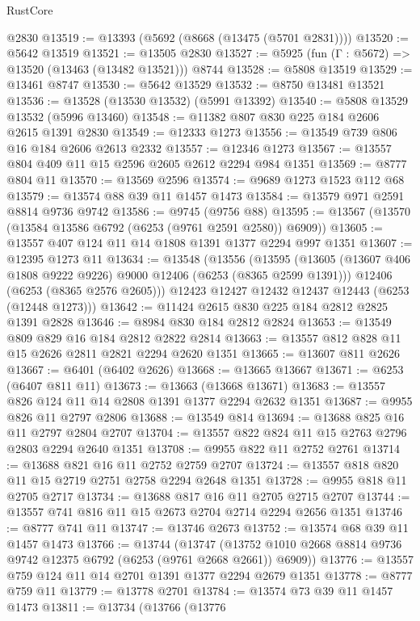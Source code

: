 \begin{lexlean}{RustCore}
\begin{coremodule}
    @2830
@13519 := @13393 (@5692 (@8668 (@13475 (@5701 @2831))))
@13520 := @5642 @13519
@13521 := @13505 @2830
@13527 := @5925 (fun (Γ : @5672) => @13520 (@13463 (@13482 @13521))) @8744
@13528 := @5808 @13519
@13529 := @13461 @8747
@13530 := @5642 @13529
@13532 := @8750 @13481 @13521
@13536 := @13528 (@13530 @13532) (@5991 @13392)
@13540 := @5808 @13529 @13532 (@5996 @13460)
@13548 := @11382 @807 @830 @225 @184 @2606 @2615 @1391 @2830
@13549 := @12333 @1273
@13556 := @13549 @739 @806 @16 @184 @2606 @2613 @2332
@13557 := @12346 @1273
@13567 := @13557 @804 @409 @11 @15 @2596 @2605 @2612 @2294 @984 @1351
@13569 := @8777 @804 @11
@13570 := @13569 @2596
@13574 := @9689 @1273 @1523 @112 @68
@13579 := @13574 @88 @39 @11 @1457 @1473
@13584 := @13579 @971 @2591 @8814 @9736 @9742
@13586 := @9745 (@9756 @88)
@13595 := @13567 (@13570 (@13584 @13586 @6792 (@6253 (@9761 @2591 @2580)) @6909))
@13605 := @13557 @407 @124 @11 @14 @1808 @1391 @1377 @2294 @997 @1351
@13607 := @12395 @1273 @11
@13634 := @13548
    (@13556
      (@13595
        (@13605 (@13607 @406 @1808 @9222 @9226) @9000 @12406 (@6253 (@8365 @2599 @1391)))
        @12406
        (@6253 (@8365 @2576 @2605)))
      @12423
      @12427
      @12432
      @12437
      @12443
      (@6253 (@12448 @1273)))
@13642 := @11424 @2615 @830 @225 @184 @2812 @2825 @1391 @2828
@13646 := @8984 @830 @184 @2812 @2824
@13653 := @13549 @809 @829 @16 @184 @2812 @2822 @2814
@13663 := @13557 @812 @828 @11 @15 @2626 @2811 @2821 @2294 @2620 @1351
@13665 := @13607 @811 @2626
@13667 := @6401 (@6402 @2626)
@13668 := @13665 @13667
@13671 := @6253 (@6407 @811 @11)
@13673 := @13663 (@13668 @13671)
@13683 := @13557 @826 @124 @11 @14 @2808 @1391 @1377 @2294 @2632 @1351
@13687 := @9955 @826 @11 @2797 @2806
@13688 := @13549 @814
@13694 := @13688 @825 @16 @11 @2797 @2804 @2707
@13704 := @13557 @822 @824 @11 @15 @2763 @2796 @2803 @2294 @2640 @1351
@13708 := @9955 @822 @11 @2752 @2761
@13714 := @13688 @821 @16 @11 @2752 @2759 @2707
@13724 := @13557 @818 @820 @11 @15 @2719 @2751 @2758 @2294 @2648 @1351
@13728 := @9955 @818 @11 @2705 @2717
@13734 := @13688 @817 @16 @11 @2705 @2715 @2707
@13744 := @13557 @741 @816 @11 @15 @2673 @2704 @2714 @2294 @2656 @1351
@13746 := @8777 @741 @11
@13747 := @13746 @2673
@13752 := @13574 @68 @39 @11 @1457 @1473
@13766 := @13744
    (@13747 (@13752 @1010 @2668 @8814 @9736 @9742 @12375 @6792 (@6253 (@9761 @2668 @2661)) @6909))
@13776 := @13557 @759 @124 @11 @14 @2701 @1391 @1377 @2294 @2679 @1351
@13778 := @8777 @759 @11
@13779 := @13778 @2701
@13784 := @13574 @73 @39 @11 @1457 @1473
@13811 := @13734
    (@13766
      (@13776

\end{coremodule}
\end{lexlean}

